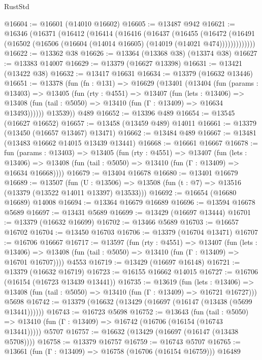 \begin{lexlean}{RustStd}
\begin{coremodule}
@16604 := @16601 (@14010 @16602)
@16605 := @13487 @942
@16621 := @16346
    (@16371
      (@16412
        (@16414
          (@16416
            (@16437
              (@16455
                (@16472
                  (@16491 (@16502 (@16506 (@16604 (@14014 @16605) (@14019 (@14021 @474)))))))))))))
@16622 := @13362 @38
@16626 := @13364 (@13368 @38) (@13374 @38)
@16627 := @13383 @14007
@16629 := @13379 (@16627 @13398)
@16631 := @13421 (@13422 @38)
@16632 := @13417 @16631
@16634 := @13379 (@16632 @13446)
@16651 := @13378
    (fun (fn : @131) =>
    @16629
      (@13401
        (@13404
          (fun (params : @13403) =>
          @13405
            (fun (rty : @4551) =>
            @13407
              (fun (lets : @13406) =>
              @13408 (fun (tail : @5050) => @13410 (fun (Γ : @13409) => @16634 @13493))))))
        @13539))
    @489
@16652 := @13396 @489
@16654 := @13545 (@16627 @16652)
@16657 := @13458 (@13459 @489) @14011
@16661 := @13379 (@13450 (@16657 @13467) @13471)
@16662 := @13484 @489
@16667 := @13481 (@13483 @16662 @14015 @13439 @13441)
@16668 := @16661 @16667
@16678 := fun (params : @13403) =>
  @13405
    (fun (rty : @4551) =>
    @13407
      (fun (lets : @13406) =>
      @13408 (fun (tail : @5050) => @13410 (fun (Γ : @13409) => @16634 @16668))))
@16679 := @13404 @16678
@16680 := @13401 @16679
@16689 := @13507
    (fun (U : @13506) => @13508 (fun (t : @7) => @13516 (@13379 (@13522 @14011 @13397) @13533)))
@16692 := @16654 (@16680 @16689) @14008
@16694 := @13364 @16679 @16689
@16696 := @13594 @16678 @5689
@16697 := @13431 @5689
@16699 := @13429 (@16697 @13444)
@16701 := @13379 (@16632 @16699)
@16702 := @13466 @5689
@16703 := @16657 @16702
@16704 := @13450 @16703
@16706 := @13379 (@16704 @13471)
@16707 := @16706 @16667
@16717 := @13597
    (fun (rty : @4551) =>
    @13407
      (fun (lets : @13406) =>
      @13408 (fun (tail : @5050) => @13410 (fun (Γ : @13409) => @16701 @16707))))
    @4553
@16719 := @13429 (@16697 @16148)
@16721 := @13379 (@16632 @16719)
@16723 := @16155 @16662 @14015
@16727 := @16706 (@16154 (@16723 @13439 @13441))
@16735 := @13619
    (fun (lets : @13406) =>
    @13408 (fun (tail : @5050) => @13410 (fun (Γ : @13409) => @16721 @16727)))
    @5698
@16742 := @13379 (@16632 (@13429 (@16697 (@16147 (@13438 (@5699 @13441))))))
@16743 := @16723 @5698
@16752 := @13643
    (fun (tail : @5050) => @13410 (fun (Γ : @13409) => @16742 (@16706 (@16154 (@16743 @13441)))))
    @5707
@16757 := @16632 (@13429 (@16697 (@16147 (@13438 @5708))))
@16758 := @13379 @16757
@16759 := @16743 @5707
@16765 := @13661 (fun (Γ : @13409) => @16758 (@16706 (@16154 @16759))) @16489

\end{coremodule}
\end{lexlean}
